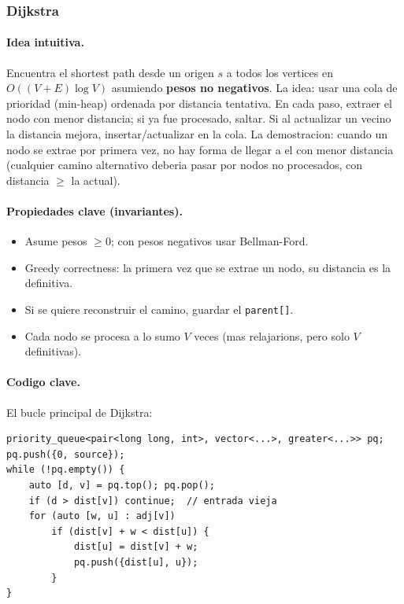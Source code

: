 ﻿\subsubsection{Dijkstra}

\paragraph{Idea intuitiva.}
Encuentra el shortest path desde un origen $s$ a todos los vertices en $O((V + E) \log V)$ asumiendo \textbf{pesos no negativos}. La idea: usar una cola de prioridad (min-heap) ordenada por distancia tentativa. En cada paso, extraer el nodo con menor distancia; si ya fue procesado, saltar. Si al actualizar un vecino la distancia mejora, insertar/actualizar en la cola. La demostracion: cuando un nodo se extrae por primera vez, no hay forma de llegar a el con menor distancia (cualquier camino alternativo deberia pasar por nodos no procesados, con distancia $\ge$ la actual).

\paragraph{Propiedades clave (invariantes).}
\begin{itemize}\setlength\itemsep{0pt}
	\item Asume pesos $\ge 0$; con pesos negativos usar Bellman-Ford.
	\item Greedy correctness: la primera vez que se extrae un nodo, su distancia es la definitiva.
	\item Si se quiere reconstruir el camino, guardar el \texttt{parent[]}.
	\item Cada nodo se procesa a lo sumo $V$ veces (mas relajarions, pero solo $V$ definitivas).
\end{itemize}

\paragraph{Codigo clave.}
El bucle principal de Dijkstra:
\begin{verbatim}
priority_queue<pair<long long, int>, vector<...>, greater<...>> pq;
pq.push({0, source});
while (!pq.empty()) {
    auto [d, v] = pq.top(); pq.pop();
    if (d > dist[v]) continue;  // entrada vieja
    for (auto [w, u] : adj[v])
        if (dist[v] + w < dist[u]) {
            dist[u] = dist[v] + w;
            pq.push({dist[u], u});
        }
}
\end{verbatim}


